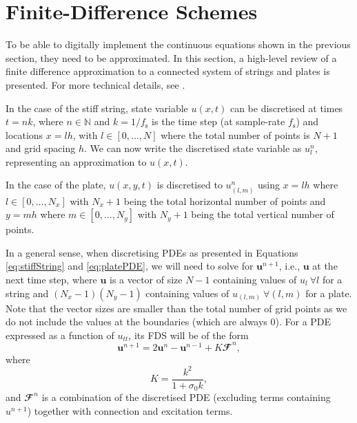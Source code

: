 \section{Finite-Difference Schemes}\label{sec:FDS}
To be able to digitally implement the continuous equations shown in the previous section, they need to be approximated. In this section, a high-level review of a finite difference approximation to a connected system of strings and plates is presented. For more technical details, see \cite{Bilbao2009:ModularPercussion}. 

In the case of the stiff string, state variable $u(x,t)$ can be discretised at times $t = nk$, where $n \in \mathbb{N}$ and $k = 1 / f_\text{s}$ is the time step (at sample-rate $f_\text{s}$) and locations $x = lh$, with $l \in [0,\hdots, N]$ where the total number of points is $N+1$ and grid spacing $h$. We can now write the discretised state variable as $u_l^n$, representing an approximation to $u(x,t)$. 

In the case of the plate, $u(x,y,t)$ is discretised to $u_{(l,m)}^n$ using $x = lh$ where $l \in [0,\hdots, N_x]$ with $N_x+1$ being the total horizontal number of points and $y = mh$ where $m \in [0,\hdots,N_y]$ with $N_y+1$ being the total vertical number of points. 

In a general sense, when discretising PDEs as presented in Equations \eqref{eq:stiffString} and \eqref{eq:platePDE}, we will need to solve for $\mathbf{u}^{n+1}$, i.e., $\mathbf{u}$ at the next time step, where $\mathbf{u}$ is a vector of size $N-1$ containing values of $u_l \ \forall l$ for a string and $(N_x-1)(N_y-1)$ containing values of $u_{(l,m)}\ \forall (l,m)$ for a plate. Note that the vector sizes are smaller than the total number of grid points as we do not include the values at the boundaries (which are always 0).
For a PDE expressed as a function of $u_{tt}$, its FDS will be of the form
\begin{equation}\label{eq:FDSform}
    \mathbf{u}^{n+1} = 2\mathbf{u}^n-\mathbf{u}^{n-1} + K\mathbfcal{F}^n,
\end{equation}
where
\begin{equation}\label{eq:K}
    K = \frac{k^2}{1+\sigma_0k},
\end{equation}
and $\mathbfcal{F}^n$ is a combination of the discretised PDE (excluding terms containing $u^{n+1}$) together with connection and excitation terms.


